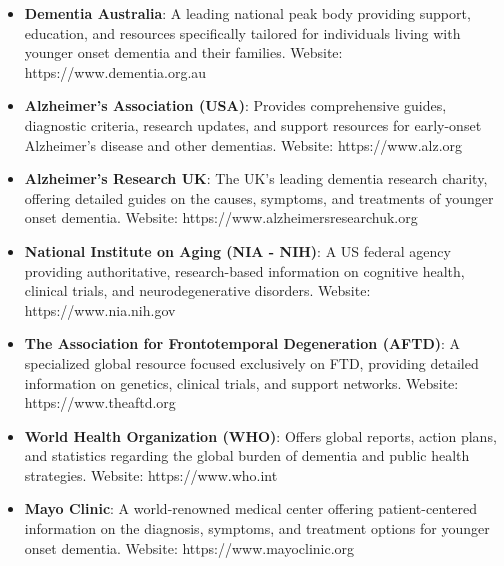 \begin{itemize}
    \item \textbf{Dementia Australia}: A leading national peak body providing support, education, and resources specifically tailored for individuals living with younger onset dementia and their families. Website: https://www.dementia.org.au
    \item \textbf{Alzheimer's Association (USA)}: Provides comprehensive guides, diagnostic criteria, research updates, and support resources for early-onset Alzheimer's disease and other dementias. Website: https://www.alz.org
    \item \textbf{Alzheimer's Research UK}: The UK's leading dementia research charity, offering detailed guides on the causes, symptoms, and treatments of younger onset dementia. Website: https://www.alzheimersresearchuk.org
    \item \textbf{National Institute on Aging (NIA - NIH)}: A US federal agency providing authoritative, research-based information on cognitive health, clinical trials, and neurodegenerative disorders. Website: https://www.nia.nih.gov
    \item \textbf{The Association for Frontotemporal Degeneration (AFTD)}: A specialized global resource focused exclusively on FTD, providing detailed information on genetics, clinical trials, and support networks. Website: https://www.theaftd.org
    \item \textbf{World Health Organization (WHO)}: Offers global reports, action plans, and statistics regarding the global burden of dementia and public health strategies. Website: https://www.who.int
    \item \textbf{Mayo Clinic}: A world-renowned medical center offering patient-centered information on the diagnosis, symptoms, and treatment options for younger onset dementia. Website: https://www.mayoclinic.org
\end{itemize}
